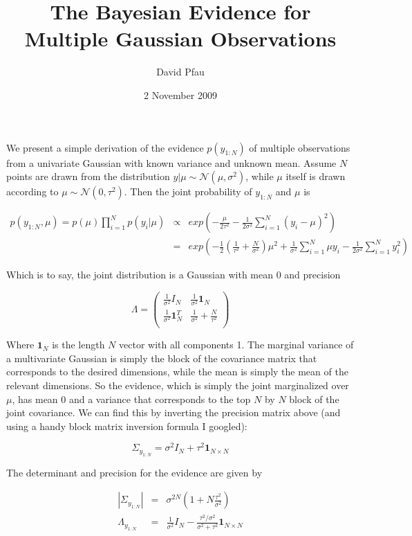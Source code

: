 \documentclass[11pt]{article}
\title{The Bayesian Evidence for Multiple Gaussian Observations}
\author{David Pfau}
\date{2 November 2009}                                           %
\begin{document}
\maketitle
We present a simple derivation of the evidence $p(y_{1:N})$ of multiple observations from a univariate Gaussian with known variance and unknown mean.  Assume $N$ points are drawn from the distribution $y|\mu \sim \mathcal{N}(\mu,\sigma^2) $, while $\mu$ itself is drawn according to $\mu \sim \mathcal{N}(0,\tau^2)$.  Then the joint probability of $y_{1:N}$ and $\mu$ is

\begin{eqnarray}
p(y_{1:N},\mu) = p(\mu)\prod_{i=1}^N p(y_i|\mu) & \propto & exp\left(-\frac{\mu}{2\tau^2} - \frac{1}{2\sigma^2} \sum_{i=1}^N (y_i - \mu)^2\right) \\
& = & exp\left( -\frac{1}{2}\left(\frac{1}{\tau^2} + \frac{N}{\sigma^2}\right)\mu^2 + \frac{1}{\sigma^2} \sum_{i=1}^N \mu y_i - \frac{1}{2\sigma^2}\sum_{i=1}^N y_i^2 \right) \nonumber
\end{eqnarray}

Which is to say, the joint distribution is a Gaussian with mean 0 and precision

\begin{equation}
\Lambda = \left( \begin{array}{cc}
\frac{1}{\sigma^2} I_N & \frac{1}{\sigma^2}\mathbf{1}_N \\
 \frac{1}{\sigma^2}\mathbf{1}_N^T & \frac{1}{\sigma^2} + \frac{N}{\tau^2} \\
\end{array} \right)
\end{equation}

Where $\mathbf{1}_N$ is the length $N$ vector with all components 1.  The marginal variance of a multivariate Gaussian is simply the block of the covariance matrix that corresponds to the desired dimensions, while the mean is simply the mean of the relevant dimensions.  So the evidence, which is simply the joint marginalized over $\mu$, has mean 0 and a variance that corresponds to the top $N$ by $N$ block of the joint covariance.  We can find this by inverting the precision matrix above (and using a handy block matrix inversion formula I googled):

\begin{equation}
\Sigma_{y_{1:N}} =  \sigma^2 I_N + \tau^2 \mathbf{1}_{N\times N}
\end{equation}

The determinant and precision for the evidence are given by

\begin{eqnarray*}
|\Sigma_{y_{1:N}}| & = & \sigma^{2N}\left(1 + N\frac{\tau^2}{\sigma^2}\right) \\
\Lambda_{y_{1:N}} & = & \frac{1}{\sigma^2}I_N - \frac{\tau^2/\sigma^2}{\sigma^2 + \tau^2} \mathbf{1}_{N\times N}
\end{eqnarray*}
\end{document}
